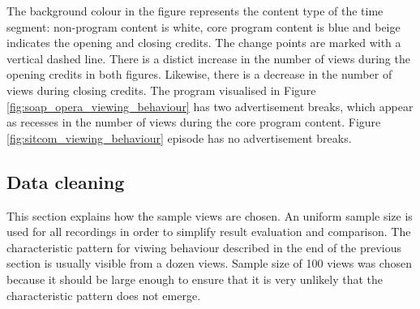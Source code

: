The background colour in the figure represents the content type of the time segment: non-program content is white, core program content is blue and beige indicates the opening and closing credits. The change points are marked with a vertical dashed line.
There is a distict increase in the number of views during the opening credits in both figures. Likewise, there is a decrease in the number of views during closing credits.
The program visualised in Figure \ref{fig:soap_opera_viewing_behaviour} has two advertisement breaks, which appear as recesses in the number of views during the core program content. Figure \ref{fig:sitcom_viewing_behaviour} episode has no advertisement breaks.

\subsection{Data cleaning} %


This section explains how the sample views are chosen. An uniform sample size is used for all recordings in order to simplify result evaluation and comparison. The characteristic pattern for viwing behaviour described in the end of the previous section is usually visible from a dozen views. Sample size of 100 views was chosen because it should be large enough to ensure that it is very unlikely that the characteristic pattern does not emerge. %

